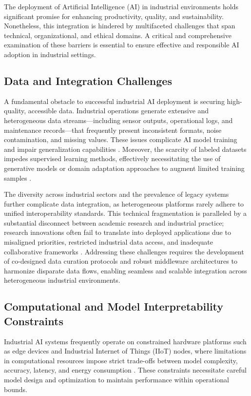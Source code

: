 \documentclass[sigconf]{acmart}
\begin{document}
The deployment of Artificial Intelligence (AI) in industrial environments holds significant promise for enhancing productivity, quality, and sustainability. Nonetheless, this integration is hindered by multifaceted challenges that span technical, organizational, and ethical domains. A critical and comprehensive examination of these barriers is essential to ensure effective and responsible AI adoption in industrial settings.

\subsection{Data and Integration Challenges}

A fundamental obstacle to successful industrial AI deployment is securing high-quality, accessible data. Industrial operations generate extensive and heterogeneous data streams---including sensor outputs, operational logs, and maintenance records---that frequently present inconsistent formats, noise contamination, and missing values. These issues complicate AI model training and impair generalization capabilities \cite{ref6,ref9}. Moreover, the scarcity of labeled datasets impedes supervised learning methods, effectively necessitating the use of generative models or domain adaptation approaches to augment limited training samples \cite{ref2,ref3}.

The diversity across industrial sectors and the prevalence of legacy systems further complicate data integration, as heterogeneous platforms rarely adhere to unified interoperability standards. This technical fragmentation is paralleled by a substantial disconnect between academic research and industrial practice; research innovations often fail to translate into deployed applications due to misaligned priorities, restricted industrial data access, and inadequate collaborative frameworks \cite{ref3}. Addressing these challenges requires the development of co-designed data curation protocols and robust middleware architectures to harmonize disparate data flows, enabling seamless and scalable integration across heterogeneous industrial environments.

\subsection{Computational and Model Interpretability Constraints}

Industrial AI systems frequently operate on constrained hardware platforms such as edge devices and Industrial Internet of Things (IIoT) nodes, where limitations in computational resources impose strict trade-offs between model complexity, accuracy, latency, and energy consumption \cite{ref2,ref31}. These constraints necessitate careful model design and optimization to maintain performance within operational bounds.
\end{document}
